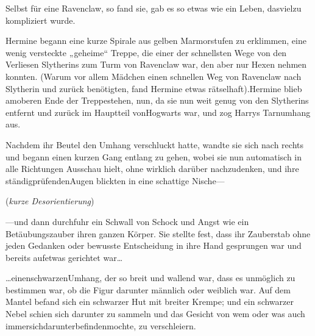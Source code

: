 Selbst für eine Ravenclaw, so fand sie, gab es so etwas wie ein Leben, dasvielzu kompliziert wurde.

Hermine begann eine kurze Spirale aus gelben Marmorstufen zu erklimmen, eine wenig versteckte „geheime“ Treppe, die einer der schnellsten Wege von den Verliesen Slytherins zum Turm von Ravenclaw war, den aber nur Hexen nehmen konnten. (Warum vor allem Mädchen einen schnellen Weg von Ravenclaw nach Slytherin und zurück benötigten, fand Hermine etwas rätselhaft).Hermine blieb amoberen Ende der Treppestehen, nun, da sie nun weit genug von den Slytherins entfernt und zurück im Hauptteil vonHogwarts war, und zog Harrys Tarnumhang aus.

Nachdem ihr Beutel den Umhang verschluckt hatte, wandte sie sich nach rechts und begann einen kurzen Gang entlang zu gehen, wobei sie nun automatisch in alle Richtungen Ausschau hielt, ohne wirklich darüber nachzudenken, und ihre ständigprüfendenAugen blickten in eine schattige Nische—

(\emph{kurze Desorientierung})

—und dann durchfuhr ein Schwall von Schock und Angst wie ein Betäubungszauber ihren ganzen Körper. Sie stellte fest, dass ihr Zauberstab ohne jeden Gedanken oder bewusste Entscheidung in ihre Hand gesprungen war und bereits aufetwas gerichtet war…

…einenschwarzenUmhang, der so breit und wallend war, dass es unmöglich zu bestimmen war, ob die Figur darunter männlich oder weiblich war. Auf dem Mantel befand sich ein schwarzer Hut mit breiter Krempe; und ein schwarzer Nebel schien sich darunter zu sammeln und das Gesicht von wem oder was auch immersichdarunterbefindenmochte, zu verschleiern.

